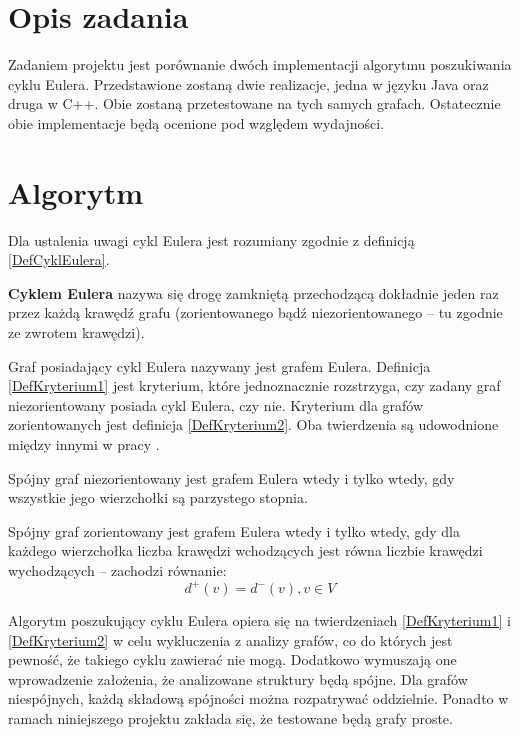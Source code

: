 \section{Opis zadania}

Zadaniem projektu jest porównanie dwóch implementacji algorytmu poszukiwania cyklu Eulera. 
Przedstawione zostaną dwie realizacje, jedna w języku Java oraz druga w C++. 
Obie zostaną przetestowane na tych samych grafach. 
Ostatecznie obie implementacje będą ocenione pod względem wydajności.

\section{Algorytm}

Dla ustalenia uwagi cykl Eulera jest rozumiany zgodnie z  definicją \ref{DefCyklEulera}.

\begin{df}
\label{DefCyklEulera}
\textbf{Cyklem Eulera} nazywa się drogę zamkniętą przechodzącą dokładnie jeden raz przez każdą krawędź grafu (zorientowanego bądź niezorientowanego -- tu zgodnie ze zwrotem krawędzi).
\end{df}

Graf posiadający cykl Eulera nazywany jest grafem Eulera. Definicja \ref{DefKryterium1} jest kryterium, które jednoznacznie rozstrzyga, czy zadany graf niezorientowany posiada cykl Eulera, czy nie. Kryterium dla grafów zorientowanych jest definicja \ref{DefKryterium2}. Oba twierdzenia są udowodnione między innymi w pracy  \cite{Wojciechowski}.

\begin{df}
\label{DefKryterium1}
Spójny graf niezorientowany jest grafem Eulera wtedy i tylko wtedy, gdy wszystkie jego wierzchołki są parzystego stopnia.
\end{df}

\begin{df}
\label{DefKryterium2}
Spójny graf zorientowany jest grafem Eulera wtedy i tylko wtedy, gdy dla każdego wierzchołka liczba krawędzi wchodzących jest równa liczbie krawędzi wychodzących -- zachodzi równanie:
\[d^{+}(v) = d^{-}(v), v \in V \]
\end{df}

Algorytm poszukujący cyklu Eulera opiera się na twierdzeniach \ref{DefKryterium1} i \ref{DefKryterium2} w celu wykluczenia z analizy grafów, co do których jest pewność, że takiego cyklu zawierać nie mogą.
Dodatkowo wymuszają one wprowadzenie założenia, że analizowane struktury będą spójne.
Dla grafów niespójnych, każdą składową spójności można rozpatrywać oddzielnie.
Ponadto w ramach niniejszego projektu zakłada się, że testowane będą grafy proste.

